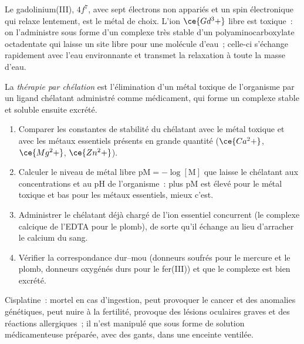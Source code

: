 Le gadolinium(III), $4f^7$, avec sept électrons non appariés et un spin électronique
qui relaxe lentement, est le métal de choix. L'ion $\ce{Gd^3+}$ libre est toxique~: on l'administre sous forme
d'un complexe très stable d'un polyaminocarboxylate octadentate qui laisse
un site libre pour une molécule d'eau~; celle-ci s'échange rapidement avec
l'eau environnante et transmet la relaxation à toute la masse d'eau.

\begin{definition}\label{def:b3:bioinorganic:chelation-therapy}
La \emph{thérapie par chélation} est l'élimination d'un
métal toxique de l'organisme par un ligand chélatant administré comme
médicament, qui forme un complexe stable et soluble ensuite excrété.
\end{definition}

\begin{method}\label{met:b3:bioinorganic:choose-chelator}
\begin{enumerate}
  \item Comparer les constantes de stabilité du chélatant avec le métal
        toxique et avec les métaux essentiels présents en grande quantité ($\ce{Ca^2+}$, $\ce{Mg^2+}$,
        $\ce{Zn^2+}$).
  \item Calculer le niveau de métal libre $\mathrm{pM} = -\log[\mathrm M]$ que laisse le chélatant
        aux concentrations et au pH de l'organisme~: plus pM est élevé pour le
        métal toxique et bas pour les métaux essentiels, mieux c'est.
  \item Administrer le chélatant déjà chargé de l'ion essentiel concurrent
        (le complexe calcique de l'EDTA pour le plomb), de sorte qu'il
        échange au lieu d'arracher le calcium du sang.
  \item Vérifier la correspondance dur--mou (donneurs soufrés pour le
        mercure et le plomb, donneurs oxygénés durs pour le fer(III)) et que
        le complexe est bien excrété.
\end{enumerate}
\end{method}

\begin{safety}{}
Cisplatine~: mortel en cas d'ingestion, peut provoquer le cancer et des
anomalies génétiques, peut nuire à la fertilité, provoque des lésions
oculaires graves et des réactions allergiques~; il n'est manipulé que sous
forme de solution médicamenteuse préparée, avec des gants, dans une
enceinte ventilée.
\end{safety}

